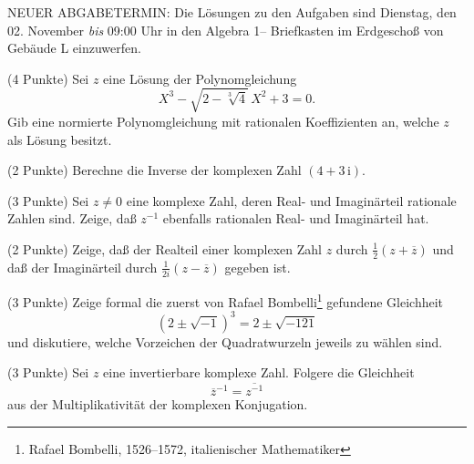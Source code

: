 \documentclass{algsheet}
\author{Dipl.-Math.~Franz Vogler}
\date{26.~Oktober 2010}
\begin{document}
                \maketitle
NEUER ABGABETERMIN:\newline
Die Lösungen zu den Aufgaben sind Dienstag, den 02. November \emph{bis} 09:00 Uhr in den \glqq Algebra 1\grqq-- Briefkasten
im Erdgeschoß  von Gebäude L einzuwerfen.

\begin{exercise}(4 Punkte)\newline
    Sei \(z\) eine Lösung der Polynomgleichung
    \[
        X^3 -  \sqrt{2 - \sqrt[3] 4} \, X^2 + 3 = 0.     
    \]
    Gib eine normierte Polynomgleichung mit rationalen Koeffizienten an,
    welche \(z\) als Lösung besitzt.
\end{exercise}

\begin{exercise}(2 Punkte)\newline
    Berechne die Inverse der komplexen Zahl $(4 + 3 \, \mathrm i)$.
\end{exercise}

\begin{exercise}(3 Punkte)\newline
    Sei \(z \neq 0\) eine komplexe Zahl, deren Real- und Imaginärteil rationale
    Zahlen sind. Zeige, daß \(z^{-1}\) ebenfalls rationalen Real- und Imaginärteil
    hat.
\end{exercise}

\begin{exercise}(2 Punkte)\newline
    Zeige, daß der Realteil einer komplexen Zahl \(z\) durch
    \(\frac 1 2 (z + \overline z)\)
    und daß der Imaginärteil durch \(\frac 1 {2 i} (z - \overline z)\)
    gegeben ist.
\end{exercise}

\begin{exercise}(3 Punkte)\newline
    Zeige formal die zuerst von Rafael Bombelli\footnote{Rafael Bombelli,
        1526--1572, italienischer Mathematiker} gefundene
    Gleichheit
    \[
        (2 \pm \sqrt{-1})^3 = 2 \pm \sqrt{- 121}
    \]
    und diskutiere, welche Vorzeichen der Quadratwurzeln jeweils zu wählen sind.
\end{exercise}

\begin{exercise}(3 Punkte)\newline
    Sei \(z\) eine invertierbare komplexe Zahl. Folgere die Gleichheit
    \[  
        \overline{z}^{-1} = \overline{z^{-1}}
    \]
    aus der Multiplikativität der komplexen Konjugation.
\end{exercise}
\end{document}
